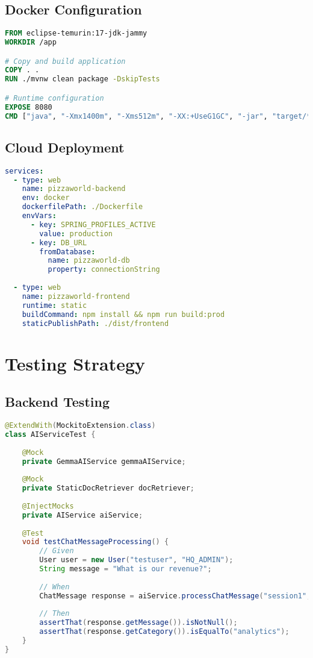 \documentclass[11pt,a4paper]{article}
\begin{document}
\subsection{Docker Configuration}

\begin{lstlisting}[language=dockerfile, caption=Production Dockerfile]
FROM eclipse-temurin:17-jdk-jammy
WORKDIR /app

# Copy and build application
COPY . .
RUN ./mvnw clean package -DskipTests

# Runtime configuration
EXPOSE 8080
CMD ["java", "-Xmx1400m", "-Xms512m", "-XX:+UseG1GC", "-jar", "target/*.jar"]
\end{lstlisting}

\subsection{Cloud Deployment}

\begin{lstlisting}[language=yaml, caption=Render.com Configuration]
services:
  - type: web
    name: pizzaworld-backend
    env: docker
    dockerfilePath: ./Dockerfile
    envVars:
      - key: SPRING_PROFILES_ACTIVE
        value: production
      - key: DB_URL
        fromDatabase:
          name: pizzaworld-db
          property: connectionString
          
  - type: web  
    name: pizzaworld-frontend
    runtime: static
    buildCommand: npm install && npm run build:prod
    staticPublishPath: ./dist/frontend
\end{lstlisting}

\section{Testing Strategy}

\subsection{Backend Testing}

\begin{lstlisting}[language=java, caption=Unit Test Example]
@ExtendWith(MockitoExtension.class)
class AIServiceTest {
    
    @Mock
    private GemmaAIService gemmaAIService;
    
    @Mock
    private StaticDocRetriever docRetriever;
    
    @InjectMocks
    private AIService aiService;
    
    @Test
    void testChatMessageProcessing() {
        // Given
        User user = new User("testuser", "HQ_ADMIN");
        String message = "What is our revenue?";
        
        // When
        ChatMessage response = aiService.processChatMessage("session1", message, user);
        
        // Then
        assertThat(response.getMessage()).isNotNull();
        assertThat(response.getCategory()).isEqualTo("analytics");
    }
}
\end{lstlisting}
\end{document}
